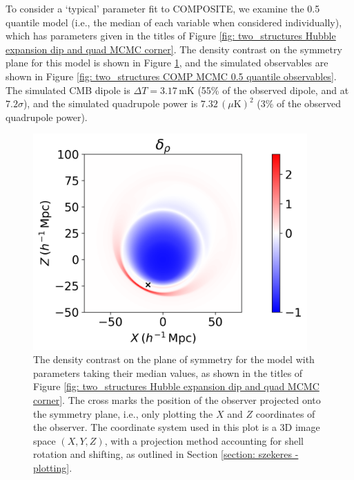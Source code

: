 \documentclass[a4paper,12pt]{report}
\begin{document}
To consider a `typical' parameter fit to COMPOSITE, we examine the 0.5 quantile model (i.e., the median of each variable when considered individually), which has parameters given in the titles of Figure \ref{fig: two_structures Hubble expansion dip and quad MCMC corner}. The density contrast on the symmetry plane for this model is shown in Figure \ref{fig: two_structures 0.5 quantile density contrast.}, and the simulated observables are shown in Figure \ref{fig: two_structures COMP MCMC 0.5 quantile observables}. The simulated CMB dipole is $\Delta T = 3.17\,$mK (55\% of the observed dipole, and at $7.2 \sigma$), and the simulated quadrupole power is $7.32\, (\mu \text{K})^2$ (3\% of the observed quadrupole power).
\begin{figure}[!b]
    \centering
    \includegraphics[width=105mm]{two structures/COMP only MCMC/0.5 quantile/density contrast.png}
    \caption{The density contrast on the plane of symmetry for the model with parameters taking their median values, as shown in the titles of Figure \ref{fig: two_structures Hubble expansion dip and quad MCMC corner}. The cross marks the position of the observer projected onto the symmetry plane, i.e., only plotting the $X$ and $Z$ coordinates of the observer. The coordinate system used in this plot is a 3D image space $(X,Y,Z)$, with a projection method accounting for shell rotation and shifting, as outlined in Section \ref{section: szekeres - plotting}.}
    \label{fig: two_structures 0.5 quantile density contrast.}
\end{figure}
\end{document}
